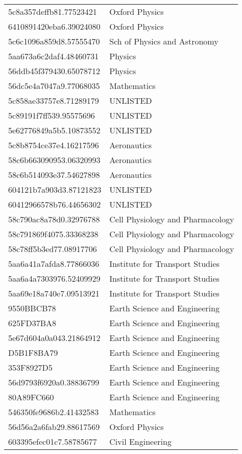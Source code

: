 \begin{tabular}{ll}
5c8a357deffb81.77523421 & Oxford Physics \\
6410891420eba6.39024080 & Oxford Physics \\
5c6c1096a859d8.57555470 & Sch of Physics and Astronomy \\
5aa673a6c2daf4.48460731 & Physics \\
56ddb45f379430.65078712 & Physics \\
56dc5e4a7047a9.77068035 & Mathematics \\
5c858ae33757e8.71289179 & UNLISTED \\
5c89191f7ff539.95575696 & UNLISTED \\
5e62776849a5b5.10873552 & UNLISTED \\
5c8b8754ce37e4.16217596 & Aeronautics \\
58c6b663090953.06320993 & Aeronautics \\
58c6b514093e37.54627898 & Aeronautics \\
604121b7a903d3.87121823 & UNLISTED \\
60412966578b76.44656302 & UNLISTED \\
58c790ac8a78d0.32976788 & Cell Physiology and Pharmacology \\
58c791869f4075.33368238 & Cell Physiology and Pharmacology \\
58c78ff5b3ed77.08917706 & Cell Physiology and Pharmacology \\
5aa6a41a7afda8.77866036 & Institute for Transport Studies \\
5aa6a4a7303976.52409929 & Institute for Transport Studies \\
5aa69e18a740e7.09513921 & Institute for Transport Studies \\
9550BBCB78 & Earth Science and Engineering \\
625FD37BA8 & Earth Science and Engineering \\
5e67d604a0a043.21864912 & Earth Science and Engineering \\
D5B1F8BA79 & Earth Science and Engineering \\
353F8927D5 & Earth Science and Engineering \\
56d9793f6920a0.38836799 & Earth Science and Engineering \\
80A89FC660 & Earth Science and Engineering \\
546350fe9686b2.41432583 & Mathematics \\
56d56a2a6fab29.88617569 & Oxford Physics \\
603395efec01c7.58785677 & Civil Engineering \\

\end{tabular}
